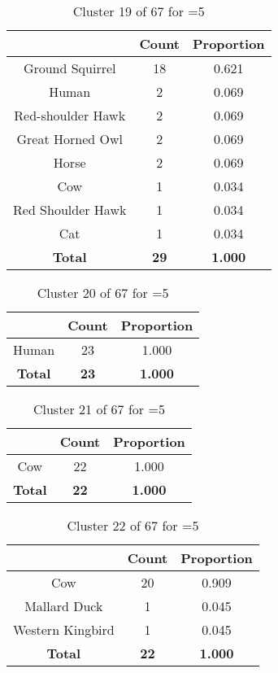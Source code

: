 \begin{table}[ht!]
\centering
\begin{tabular}{|c|c|c|}
\hline
\bf \Spec{} &\bf Count &\bf Proportion\\ \hline \hline
Ground Squirrel & 18 & 0.621\\ \hline
Human & 2 & 0.069\\ \hline
Red-shoulder Hawk & 2 & 0.069\\ \hline
Great Horned Owl & 2 & 0.069\\ \hline
Horse & 2 & 0.069\\ \hline
Cow & 1 & 0.034\\ \hline
Red Shoulder Hawk & 1 & 0.034\\ \hline
Cat & 1 & 0.034\\ \hline
\hline
\bf Total & \bf 29 & \bf 1.000\\ \hline
\end{tabular}
\label{tab:cluster:19:5}
\caption{Cluster 19 of 67 for \minneigh{}=5}
\end{table}

\clearpage
\begin{table}[ht!]
\centering
\begin{tabular}{|c|c|c|}
\hline
\bf \Spec{} &\bf Count &\bf Proportion\\ \hline \hline
Human & 23 & 1.000\\ \hline
\hline
\bf Total & \bf 23 & \bf 1.000\\ \hline
\end{tabular}
\label{tab:cluster:20:5}
\caption{Cluster 20 of 67 for \minneigh{}=5}
\end{table}

\begin{table}[ht!]
\centering
\begin{tabular}{|c|c|c|}
\hline
\bf \Spec{} &\bf Count &\bf Proportion\\ \hline \hline
Cow & 22 & 1.000\\ \hline
\hline
\bf Total & \bf 22 & \bf 1.000\\ \hline
\end{tabular}
\label{tab:cluster:21:5}
\caption{Cluster 21 of 67 for \minneigh{}=5}
\end{table}

\begin{table}[ht!]
\centering
\begin{tabular}{|c|c|c|}
\hline
\bf \Spec{} &\bf Count &\bf Proportion\\ \hline \hline
Cow & 20 & 0.909\\ \hline
Mallard Duck & 1 & 0.045\\ \hline
Western Kingbird & 1 & 0.045\\ \hline
\hline
\bf Total & \bf 22 & \bf 1.000\\ \hline
\end{tabular}
\label{tab:cluster:22:5}
\caption{Cluster 22 of 67 for \minneigh{}=5}
\end{table}

